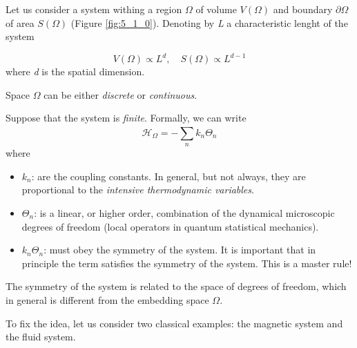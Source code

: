 \documentclass[../main/main.tex]{subfiles}
\begin{document}
Let us consider a system withing a region \( \Omega  \) of volume \( V(\Omega ) \) and boundary \( \partial{\Omega }  \)    of area \( S (\Omega ) \) (Figure \ref{fig:5_1_0}). Denoting by \emph{L} a characteristic lenght of the system

\begin{equation*}
  V(\Omega ) \propto L^d, \quad S(\Omega  ) \propto L^{d-1}
\end{equation*}
where \emph{d} is the spatial dimension.
\begin{remark}
Space \( \Omega  \) can be either \emph{discrete} or \emph{continuous}.
\end{remark}
Suppose that the system is \emph{finite}. Formally, we can write
\begin{equation}
  \mathcal{H}_{\Omega } = - \sum_{n}^{} k_n \Theta _n
\end{equation}
where
\begin{itemize}
  \item \( k_n \): are the coupling constants. In general, but not always, they are proportional to the  \emph{intensive thermodynamic variables}.
  \item \( \Theta _n \): is a linear, or higher order, combination of the dynamical microscopic degrees of freedom (local operators in quantum statistical mechanics).
  \item \( k_n \Theta _n \): must obey the symmetry of the system. It is important that in principle the term satisfies the symmetry of the system. This is a master rule!
\end{itemize}

\begin{remark}
The symmetry of the system is related to the space of degrees of freedom, which in general is different from the embedding space \( \Omega  \).
\end{remark}

To fix the idea, let us consider two classical examples: the magnetic system and the fluid system.
\end{document}
